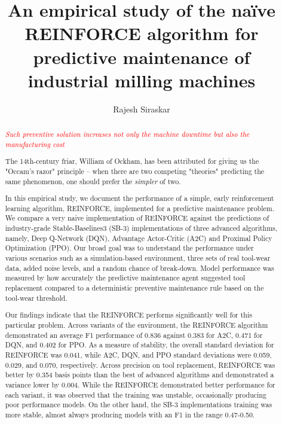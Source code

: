 \documentclass[]{article}
\title{An empirical study of the na\"ive REINFORCE algorithm for predictive maintenance of industrial milling machines}
\author{Rajesh Siraskar}
\begin{document}
\maketitle

\begin{abstract}
	

\textit{\textcolor{red}{Such preventive solution increases not only the machine downtime but also the manufacturing cost}}
 
 The 14th-century friar, William of Ockham, has been attributed for giving us the "Occam's razor" principle -- when there are two competing "theories" predicting the same phenomenon, one should prefer the \textit{simpler} of two.

In this empirical study, we document the performance of a simple, early reinforcement learning algorithm, REINFORCE, implemented for a predictive maintenance problem. We compare a very naive implementation of REINFORCE against the predictions of industry-grade Stable-Baselines3 (SB-3) implementations of three advanced algorithms, namely, Deep Q-Network (DQN), Advantage Actor-Critic (A2C) and Proximal Policy Optimization (PPO). Our broad goal was to understand the performance under various scenarios such as a simulation-based environment, three sets of real tool-wear data, added noise levels, and a random chance of break-down. Model performance was measured by how accurately the predictive maintenance agent suggested tool replacement compared to a deterministic preventive maintenance rule based on the tool-wear threshold. 

Our findings indicate that the REINFORCE performs significantly well for this particular problem. Across variants of the environment, the REINFORCE algorithm demonstrated an average F1 performance of 0.836 against 0.383 for A2C, 0.471 for DQN, and 0.402 for PPO. As a measure of stability, the overall standard deviation for REINFORCE was 0.041, while A2C, DQN, and PPO standard deviations were 0.059, 0.029, and 0.070, respectively. Across precision on tool replacement, REINFORCE was better by 0.354 basis points than the best of advanced algorithms and demonstrated a variance lower by 0.004. While the REINFORCE demonstrated better performance for each variant, it was observed that the training was unstable, occasionally producing poor performance models. On the other hand, the SB-3 implementations training was more stable, almost always producing models with an F1 in the range 0.47-0.50.


\end{abstract}
\end{document}
